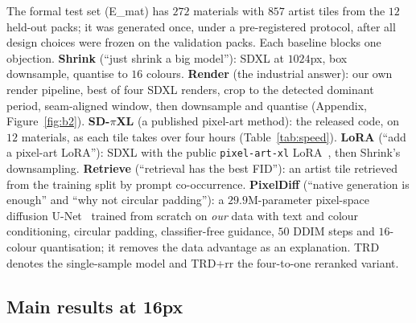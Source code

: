 \documentclass{article}
\newcommand{\trd}{\textsc{TRD}}
\begin{document}
The formal test set (E\_mat) has $272$ materials with $857$ artist tiles from
the $12$ held-out packs; it was generated once, under a pre-registered
protocol, after all design choices were frozen on the validation packs. Each
baseline blocks one objection.
\textbf{Shrink} (``just shrink a big model''): SDXL at $1024$px, box downsample,
quantise to $16$ colours.
\textbf{Render} (the industrial answer): our own render pipeline, best of four
SDXL renders, crop to the detected dominant period, seam-aligned window, then
downsample and quantise (Appendix, Figure~\ref{fig:b2}).
\textbf{SD-$\pi$XL} (a published pixel-art method): the released code,
on $12$ materials, as each tile takes over four hours (Table~\ref{tab:speed}).
\textbf{LoRA} (``add a pixel-art LoRA''): SDXL with the public
\texttt{pixel-art-xl} LoRA~\citep{hu2022lora}, then Shrink's downsampling.
\textbf{Retrieve} (``retrieval has the best FID''): an artist tile retrieved from
the training split by prompt co-occurrence.
\textbf{PixelDiff} (``native generation is enough'' and ``why not circular
padding''): a $29.9$M-parameter pixel-space diffusion
U-Net~\citep{ronneberger2015unet,ho2020ddpm} trained from scratch on
\emph{our} data with text and colour conditioning, circular padding,
classifier-free guidance, $50$ DDIM steps and $16$-colour quantisation; it
removes the data advantage as an explanation. \trd{} denotes the single-sample
model and \trd{}+rr the four-to-one reranked variant.

\subsection{Main results at 16px}
\end{document}

